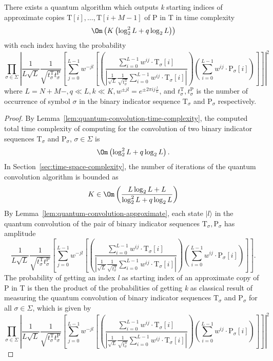 \begin{theorem}
There exists a quantum algorithm which outputs \textit{k} starting indices of approximate copies $\mathrm{T}[i],\ldots,\mathrm{T}[i+M-1]$ of P in T in time complexity
\[
	\Om\left( K\left(\log_2^2 L + q\log_2 L\right)\right)
\]
with each index having the probability
\[
   \prod_{\sigma \in \Sigma} \left\vert \frac{1}{L\sqrt{L}}\frac{1}{\sqrt{t^{\mathrm{T}}_{\sigma}t^{\mathrm{P}}_{\sigma}}}  \left[ \sum_{j=0}^{L-1} w^{-jl} \left[ \left(\frac{\sum_{i=0}^{L-1} w^{ij}\cdot\mathrm{T}_{\sigma}[i]}{\left\vert \frac{1}{\sqrt{L}}\frac{1}{\sqrt{t^{\mathrm{T}}_{\sigma}}} \sum_{i=0}^{L-1} w^{ij}\cdot\mathrm{T}_{\sigma}[i] \right\vert}\right)\left( \sum_{i=0}^{L-1} w^{ij}\cdot\mathrm{P}_{\sigma}[i]\right)  \right] \right] \right\vert^2
\]
where $L=N+M-, q \ll L, k \ll K, w^{\pm jl}=e^{\pm 2\pi i j\frac{l}{L}}$, and $t^{\mathrm{T}}_{\sigma}, t^{\mathrm{P}}_{\sigma}$ is the number of occurrence of symbol $\sigma$ in the binary indicator sequence $\mathrm{T}_{\sigma}$ and $\mathrm{P}_{\sigma}$ respectively.
\end{theorem}
\begin{proof}
By Lemma~\ref{lem:quantum-convolution-time-complexity}, the computed total time complexity of computing for the convolution of two binary indicator sequences $\mathrm{T}_{\sigma}$ and $\mathrm{P}_{\sigma}$, $\sigma \in \Sigma$ is 
\[
	\Om\left( \log_2^2 L + q\log_2 L \right).
\]
In Section~\ref{sec:time-space-complexity}, the number of iterations of the quantum convolution algorithm is bounded as
\[
	K \in \Om\left(\frac{L\log_2 L + L}{\log_2^2 L + q\log_2 L}\right)
\]
By Lemma~\ref{lem:quantum-convolution-approximate}, each state $\vert l \rangle$ in the quantum convolution of the pair of binary indicator sequences $\mathrm{T}_{\sigma}, \mathrm{P}_{\sigma}$ has amplitude
\[
	\frac{1}{L\sqrt{L}}\frac{1}{\sqrt{t^{\mathrm{T}}_{\sigma}t^{\mathrm{P}}_{\sigma}}}  \left[ \sum_{j=0}^{L-1} w^{-jl} \left[ \left(\frac{\sum_{i=0}^{L-1} w^{ij}\cdot\mathrm{T}_{\sigma}[i]}{\left\vert \frac{1}{\sqrt{L}}\frac{1}{\sqrt{t^{\mathrm{T}}_{\sigma}}} \sum_{i=0}^{L-1} w^{ij}\cdot\mathrm{T}_{\sigma}[i] \right\vert}\right)\left( \sum_{i=0}^{L-1} w^{ij}\cdot\mathrm{P}_{\sigma}[i]\right)  \right] \right].
\]
The probability of getting an index \textit{l} as starting index of an approximate copy of P in T is then the product of the probabilities of getting \textit{k} as classical result of measuring the quantum convolution of binary indicator sequences $\mathrm{T}_{\sigma}$ and $\mathrm{P}_{\sigma}$ for all $\sigma \in \Sigma$, which is given by
\[
   \prod_{\sigma \in \Sigma} \left\vert \frac{1}{L\sqrt{L}}\frac{1}{\sqrt{t^{\mathrm{T}}_{\sigma}t^{\mathrm{P}}_{\sigma}}}  \left[ \sum_{j=0}^{L-1} w^{-jl} \left[ \left(\frac{\sum_{i=0}^{L-1} w^{ij}\cdot\mathrm{T}_{\sigma}[i]}{\left\vert \frac{1}{\sqrt{L}}\frac{1}{\sqrt{t^{\mathrm{T}}_{\sigma}}} \sum_{i=0}^{L-1} w^{ij}\cdot\mathrm{T}_{\sigma}[i] \right\vert}\right)\left( \sum_{i=0}^{L-1} w^{ij}\cdot\mathrm{P}_{\sigma}[i]\right)  \right] \right] \right\vert^2
\]
\end{proof}

